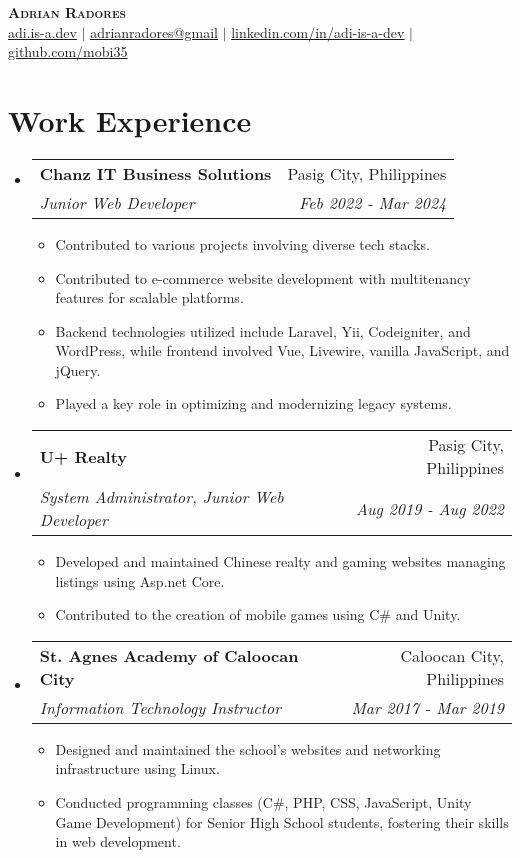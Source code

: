 \documentclass[letterpaper,11pt]{article}
\makeatletter
\newcommand{\resumeItem}[1]{
  \item\small{
    {#1 \vspace{-2pt}}
  }
}
\newcommand{\resumeSubheading}[4]{
  \vspace{-2pt}\item
    \begin{tabular*}{0.97\textwidth}[t]{l@{\extracolsep{\fill}}r}
      \textbf{#1} & #2 \\
      \textit{\small#3} & \textit{\small #4} \\
    \end{tabular*}\vspace{-7pt}
}
\newcommand{\resumeSubHeadingListStart}{\begin{itemize}[leftmargin=0.15in, label={}]}
\newcommand{\resumeSubHeadingListEnd}{\end{itemize}}
\newcommand{\resumeItemListStart}{\begin{itemize}}
\newcommand{\resumeItemListEnd}{\end{itemize}\vspace{-5pt}}
\makeatother
\begin{document}
%
%

\begin{center}
    \textbf{\Huge \scshape Adrian Radores} \\ \vspace{1pt}
    \href{https://adi.is-a.dev}{\underline{adi.is-a.dev}} $|$ \href{mailto:adrianradores@gmail}{\underline{adrianradores@gmail}} $|$ 
    \href{https://www.linkedin.com/in/adi-is-a-dev}{\underline{linkedin.com/in/adi-is-a-dev}} $|$
    \href{https://github.com/mobi35}{\underline{github.com/mobi35}}
\end{center}

\section{Work Experience}
  \resumeSubHeadingListStart

    \resumeSubheading
      {Chanz IT Business Solutions}{Pasig City, Philippines}
      {Junior Web Developer}{Feb 2022 - Mar 2024}
      \resumeItemListStart
        \resumeItem{Contributed to various projects involving diverse tech stacks.}
        \resumeItem{Contributed to e-commerce website development with multitenancy features for scalable platforms.}
        \resumeItem{Backend technologies utilized include Laravel, Yii, Codeigniter, and WordPress, while frontend involved Vue, Livewire, vanilla JavaScript, and jQuery.}
        \resumeItem{Played a key role in optimizing and modernizing legacy systems.}
      \resumeItemListEnd

    \resumeSubheading
      {U+ Realty}{Pasig City, Philippines}
      {System Administrator, Junior Web Developer}{Aug 2019 - Aug 2022}
      \resumeItemListStart
        \resumeItem{Developed and maintained Chinese realty and gaming websites managing listings using
        Asp.net Core.}
        \resumeItem{Contributed to the creation of mobile games using C\# and Unity.}
      \resumeItemListEnd

    \resumeSubheading
      {St. Agnes Academy of Caloocan City}{Caloocan City, Philippines}
      {Information Technology Instructor}{Mar 2017 - Mar 2019}
      \resumeItemListStart
        \resumeItem{Designed and maintained the school's websites and networking infrastructure using Linux.}
        \resumeItem{Conducted programming classes (C\#, PHP, CSS, JavaScript, Unity Game Development) for Senior High School
        students, fostering their skills in web development.}
      \resumeItemListEnd
  \resumeSubHeadingListEnd
\end{document}
